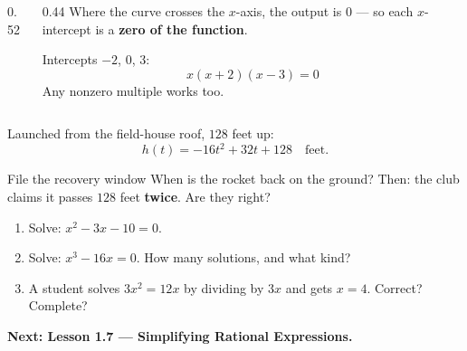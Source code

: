 \documentclass[aspectratio=169, 11pt]{beamer}
\begin{document}
\begin{frame}[t, plain]
  \begin{columns}[T]
    \begin{column}{0.52\textwidth}
      \vspace{-0.2cm}
    \end{column}
    \begin{column}{0.44\textwidth}
      Where the curve crosses the $x$-axis, the output is $0$ --- so each $x$-intercept is a
      \textbf{zero of the function}.
      \vspace{0.25cm}

      Intercepts $-2$, $0$, $3$:
      \[ x(x+2)(x-3)=0 \]
      Any nonzero multiple works too.
    \end{column}
  \end{columns}
\end{frame}

\begin{frame}[t, plain]
  Launched from the field-house roof, $128$ feet up:
  \[ h(t) = -16t^2+32t+128 \quad \text{feet.} \]
  \begin{block}{File the recovery window}
    When is the rocket back on the ground? Then: the club claims it passes $128$ feet
    \textbf{twice}. Are they right?
  \end{block}
\end{frame}

\begin{frame}[t, plain]
  \begin{enumerate}
    \setlength{\itemsep}{0.35cm}
    \item Solve: $x^2-3x-10=0$.
    \item Solve: $x^3-16x=0$. How many solutions, and what kind?
    \item A student solves $3x^2=12x$ by dividing by $3x$ and gets $x=4$. Correct? Complete?
  \end{enumerate}
  \vspace{0.3cm}
  {\color{royal}\bfseries Next: Lesson 1.7 --- Simplifying Rational Expressions.}
\end{frame}
\end{document}
